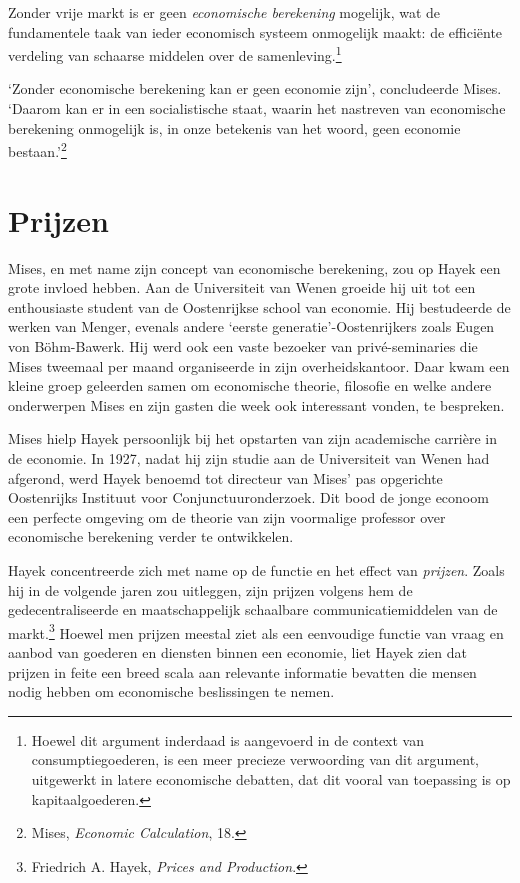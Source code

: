 \documentclass[
  a5paper,
  smalldemyvopaper,11pt,twoside,onecolumn,openright,extrafontsizes,
hidelinks]{memoir}
\begin{document}
Zonder vrije markt is er geen \emph{economische berekening} mogelijk,
wat de fundamentele taak van ieder economisch systeem onmogelijk maakt:
de efficiënte verdeling van schaarse middelen over de
samenleving.\footnote{Hoewel dit argument inderdaad is aangevoerd in de
  context van consumptiegoederen, is een meer precieze verwoording van
  dit argument, uitgewerkt in latere economische debatten, dat dit
  vooral van toepassing is op kapitaalgoederen.}

`Zonder economische berekening kan er geen economie zijn', concludeerde
Mises. `Daarom kan er in een socialistische staat, waarin het nastreven
van economische berekening onmogelijk is, in onze betekenis van het
woord, geen economie bestaan.'\footnote{\hspace{0pt}Mises,
  \emph{Economic Calculation}, 18.}

\section{Prijzen}\label{prijzen}

Mises, en met name zijn concept van economische berekening, zou op Hayek
een grote invloed hebben. Aan de Universiteit van Wenen groeide hij uit
tot een enthousiaste student van de Oostenrijkse school van economie.
Hij bestudeerde de werken van Menger, evenals andere `eerste
generatie'-Oostenrijkers zoals Eugen von Böhm-Bawerk. Hij werd ook een
vaste bezoeker van privé-seminaries die Mises tweemaal per maand
organiseerde in zijn overheidskantoor. Daar kwam een kleine groep
geleerden samen om economische theorie, filosofie en welke andere
onderwerpen Mises en zijn gasten die week ook interessant vonden, te
bespreken.

Mises hielp Hayek persoonlijk bij het opstarten van zijn academische
carrière in de economie. In 1927, nadat hij zijn studie aan de
Universiteit van Wenen had afgerond, werd Hayek benoemd tot directeur
van Mises' pas opgerichte Oostenrijks Instituut voor
Conjunctuuronderzoek. Dit bood de jonge econoom een perfecte omgeving om
de theorie van zijn voormalige professor over economische berekening
verder te ontwikkelen.

Hayek concentreerde zich met name op de functie en het effect van
\emph{prijzen}. Zoals hij in de volgende jaren zou uitleggen, zijn
prijzen volgens hem de gedecentraliseerde en maatschappelijk schaalbare
communicatiemiddelen van de markt.\footnote{Friedrich A. Hayek,
  \emph{Prices and Production}.} Hoewel men prijzen meestal ziet als een
eenvoudige functie van vraag en aanbod van goederen en diensten binnen
een economie, liet Hayek zien dat prijzen in feite een breed scala aan
relevante informatie bevatten die mensen nodig hebben om economische
beslissingen te nemen.
\end{document}
